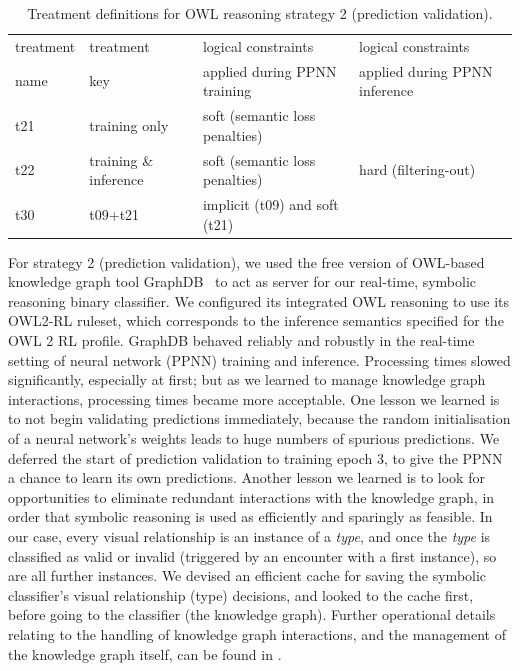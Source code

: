 \documentclass[]{jair}
\begin{document}
\begin{table}[t]
  \centering
  \footnotesize
  \begin{threeparttable}
  \caption{\footnotesize Treatment definitions for OWL reasoning strategy 2 (prediction validation).}
  \label{table:invest2-treatments}
  \begin{tabular}{llll}
    \toprule 
     treatment   & treatment  & logical constraints  & logical constraints \\
     name        & key  & applied during PPNN training & applied during PPNN inference \\
    \midrule
    t21 & training only   & soft (semantic loss penalties) &   \\
    t22 & training \& inference   & soft (semantic loss penalties) & hard (filtering-out)  \\
    t30 & t09+t21   & implicit (t09) and soft (t21) &  \\
    \bottomrule 
  \end{tabular}
  \end{threeparttable}
\end{table}

For strategy 2 (prediction validation), we used the free version of OWL-based knowledge graph tool GraphDB~\cite{graphdb} to act as server for our real-time, symbolic reasoning binary classifier.
We configured its integrated OWL reasoning to use its OWL2-RL ruleset, which corresponds to the inference semantics specified for the OWL 2 RL profile.
GraphDB behaved reliably and robustly in the real-time setting of neural network (PPNN) training and inference.
Processing times slowed significantly, especially at first; but as we learned to manage knowledge graph interactions, processing times became more acceptable.
One lesson we learned is to not begin validating predictions immediately, because the random initialisation of a neural network's weights leads to huge numbers of spurious predictions.
We deferred the start of prediction validation to training epoch 3, to give the PPNN a chance to learn its own predictions.
Another lesson we learned is to look for opportunities to eliminate redundant interactions with the knowledge graph, in order that symbolic reasoning is used as efficiently and sparingly as feasible.
In our case, every visual relationship is an instance of a \emph{type}, and once the \emph{type} is classified as valid or invalid (triggered by an encounter with a first instance), so are all further instances.
We devised an efficient cache for saving the symbolic classifier's visual relationship (type) decisions, and looked to the cache first, before going to the classifier (the knowledge graph).
Further operational details relating to the handling of knowledge graph interactions, and the management of the knowledge graph itself, can be found in \citet{HerronThesis2025}.
\end{document}
